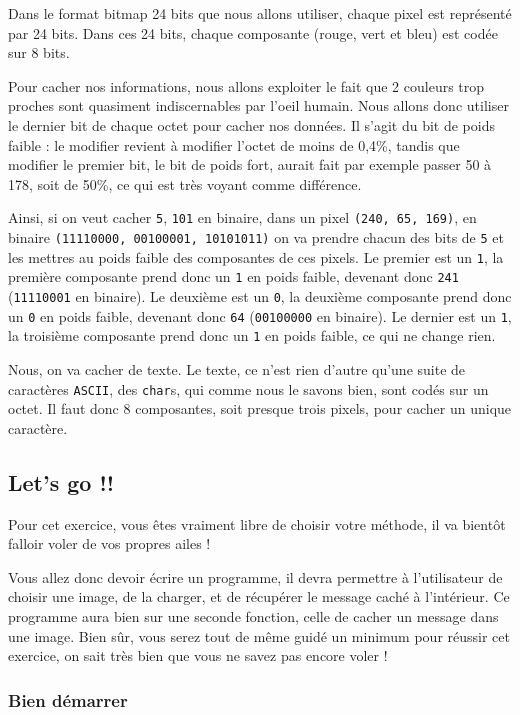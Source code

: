 \documentclass[11pt, a4paper]{article}
\begin{document}
Dans le format bitmap 24 bits que nous allons utiliser, chaque pixel est
représenté par 24 bits. Dans ces 24 bits, chaque composante (rouge, vert
et bleu) est codée sur 8 bits.

Pour cacher nos informations, nous allons exploiter le fait que 2
couleurs trop proches sont quasiment indiscernables par l'oeil humain.
Nous allons donc utiliser le dernier bit de chaque octet pour cacher nos
données. Il s'agit du bit de poids faible : le modifier revient à
modifier l'octet de moins de 0,4\%, tandis que modifier le premier bit,
le bit de poids fort, aurait fait par exemple passer 50 à 178, soit de
50\%, ce qui est très voyant comme différence.

Ainsi, si on veut cacher \texttt{5}, \texttt{101} en binaire, dans un
pixel \texttt{(240, 65, 169)}, en binaire
\texttt{(11110000, 00100001, 10101011)} on va prendre chacun des bits de
\texttt{5} et les mettres au poids faible des composantes de ces pixels.
Le premier est un \texttt{1}, la première composante prend donc un
\texttt{1} en poids faible, devenant donc \texttt{241}
(\texttt{11110001} en binaire). Le deuxième est un \texttt{0}, la
deuxième composante prend donc un \texttt{0} en poids faible, devenant
donc \texttt{64} (\texttt{00100000} en binaire). Le dernier est un
\texttt{1}, la troisième composante prend donc un \texttt{1} en poids
faible, ce qui ne change rien.

Nous, on va cacher de texte. Le texte, ce n'est rien d'autre qu'une
suite de caractères \texttt{ASCII}, des \texttt{char}s, qui comme nous
le savons bien, sont codés sur un octet. Il faut donc 8 composantes,
soit presque trois pixels, pour cacher un unique caractère.

\subsection{Let's go !!}\label{lets-go}

Pour cet exercice, vous êtes vraiment libre de choisir votre méthode, il
va bientôt falloir voler de vos propres ailes !

Vous allez donc devoir écrire un programme, il devra permettre à
l'utilisateur de choisir une image, de la charger, et de récupérer le
message caché à l'intérieur. Ce programme aura bien sur une seconde
fonction, celle de cacher un message dans une image. Bien sûr, vous
serez tout de même guidé un minimum pour réussir cet exercice, on sait
très bien que vous ne savez pas encore voler !

\subsubsection{Bien démarrer}\label{bien-duxe9marrer}
\end{document}
